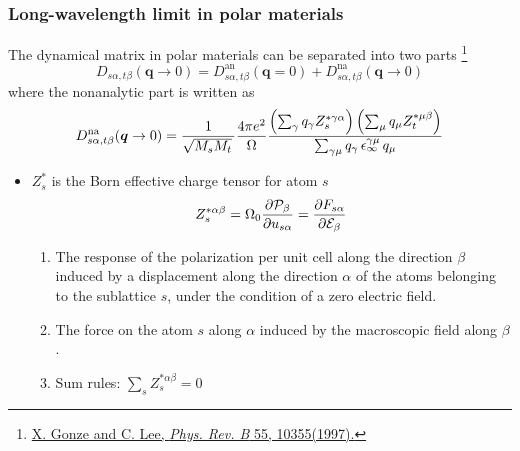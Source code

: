 \begin{frame}
  \frametitle{Long-wavelength limit in polar materials}
  The dynamical matrix in polar materials can be separated into two parts
  \footnote{
    \href{https://journals.aps.org/prb/abstract/10.1103/PhysRevB.55.10355}
         {X. Gonze and C. Lee, \textit{Phys. Rev. B}\/ 55, 10355(1997).}
  }
  \begin{equation*}
    D_{s\alpha,t\beta}(\boldsymbol{q} \to 0) = 
    D^{\text{an}}_{s\alpha,t\beta}(\boldsymbol{q} = 0) +
    D^{\text{na}}_{s\alpha,t\beta}(\boldsymbol{q} \to 0)
  \end{equation*}
  where the nonanalytic part is written as
  \begin{equation}
    \label{eq:dynmat_nac}
    D^{\text{na}}_{s\alpha,t\beta}(\boldsymbol{q} \to 0)
    =
    {1\over\sqrt{M_sM_t}\,}
    {4\pi e^2\over\Omega}
    \frac{
      \left(
        \sum_{\gamma} q_\gamma Z^{*\gamma\alpha}_s
      \right) 
      \left(
      \sum_{\mu} q_\mu Z^{*\mu\beta}_t
      \right) 
    }{
      \sum_{\gamma\mu} q_\gamma \, \epsilon_\infty^{\gamma\mu} \,q_\mu 
    }
  \end{equation}
  \begin{itemize}
    \item
      $Z^*_s$ is the Born effective charge tensor for atom $s$
        \begin{equation*}
        Z_s^{*\alpha\beta} = \Omega_0
        \frac{
            \partial {\cal P}_\beta
        }{
            \partial u_{s\alpha}
        }
        =
        \frac{
            \partial F_{s\alpha}
        }{
            \partial {\cal E}_\beta
        }
        \end{equation*}

        \begin{enumerate}
        \setlength\itemsep{\smallskipamount}
        \item The response of the polarization per unit cell along the direction
          $\beta$ induced by a displacement along the direction $\alpha$ of the atoms
          belonging to the sublattice $s$, under the condition of a zero electric
          field.
          
        \item The force on the atom $s$ along $\alpha$ induced by the macroscopic
          field along $\beta$.

          
        \item Sum rules: 
          $
          \sum_s Z_s^{*\alpha\beta} = 0
          $
          

\end{enumerate}
\end{itemize}
\end{frame}
